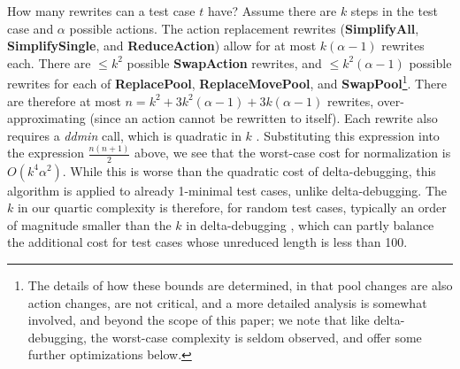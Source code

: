 How many rewrites can a test case $t$ have?  Assume there are $k$
steps in the test case and $\alpha$ possible actions.  The action
replacement rewrites ({\bf SimplifyAll}, {\bf SimplifySingle}, and
{\bf ReduceAction}) allow for at most $k (\alpha-1)$ rewrites each.  There
are $\leq k^2$ possible {\bf SwapAction} rewrites, and $\leq k^2(\alpha-1)$
possible rewrites for each of {\bf ReplacePool}, {\bf
  ReplaceMovePool}, and {\bf SwapPool}\footnote{The details of how
  these bounds are determined, in that pool changes are also action
  changes, are not critical, and a more detailed analysis is somewhat
  involved, and beyond the scope of this paper; we note that like
  delta-debugging, the worst-case complexity is seldom observed, and
  offer some further optimizations below.}.  There are therefore at
most $n=k^2 + 3k^2(\alpha-1) + 3k(\alpha-1)$ rewrites, over-approximating (since
an action cannot be rewritten to itself).  Each rewrite also
requires a \emph{ddmin} call, which is quadratic in $k$ \cite{DD}.
Substituting this expression into the expression $\frac{n(n+1)}{2}$
above, we see that the worst-case cost for normalization is
$O(k^4\alpha^2)$.  While this is
worse than the quadratic cost of delta-debugging, this algorithm is
applied to already 1-minimal test cases, unlike delta-debugging. The $k$ in our quartic complexity
is therefore, for random test cases, typically an order of magnitude smaller
than the $k$ in delta-debugging \cite{ICSEDiff,icst2014,MinUnit},
which can partly balance the additional cost for test cases whose
unreduced length is less than 100.


